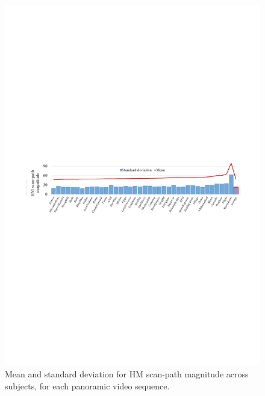 \documentclass[10pt,journal,compsoc]{IEEEtran}
\begin{document}
\begin{figure}
	\begin{center}
		\centerline{\includegraphics[width=2\columnwidth]{figures/database/consistence-magnitude2}}
		\caption{\footnotesize{Mean and standard deviation for HM scan-path magnitude across subjects, for each panoramic video sequence.}}
		\label{consistence-magnitude}
	\end{center}
\end{figure}
\end{document}
